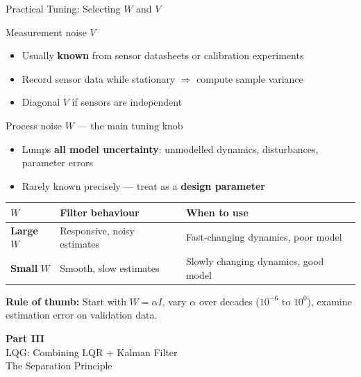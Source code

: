 \documentclass[aspectratio=169,11pt]{beamer}
\begin{document}
\begin{frame}[shrink=5]{Practical Tuning: Selecting $W$ and $V$}
\begin{block}{Measurement noise $V$}
\begin{itemize}
  \item Usually \textbf{known} from sensor datasheets or calibration experiments
  \item Record sensor data while stationary $\Rightarrow$ compute sample variance
  \item Diagonal $V$ if sensors are independent
\end{itemize}
\end{block}

\begin{block}{Process noise $W$ --- the main tuning knob}
\begin{itemize}
  \item Lumps \textbf{all model uncertainty}: unmodelled dynamics, disturbances, parameter errors
  \item Rarely known precisely --- treat as a \textbf{design parameter}
\end{itemize}
\end{block}

\begin{center}
\renewcommand{\arraystretch}{1.2}
\begin{tabular}{l l l}
\toprule
$W$ & Filter behaviour & When to use \\
\midrule
\textbf{Large} $W$ & Responsive, noisy estimates & Fast-changing dynamics, poor model \\
\textbf{Small} $W$ & Smooth, slow estimates & Slowly changing dynamics, good model \\
\bottomrule
\end{tabular}
\end{center}

\smallskip
{\small \textbf{Rule of thumb:} Start with $W = \alpha I$, vary $\alpha$ over decades ($10^{-6}$ to $10^{0}$), examine estimation error on validation data.}
\end{frame}


\begin{frame}{}
\centering
\vfill
{\Huge\bfseries Part III}\\[12pt]
{\Large LQG: Combining LQR + Kalman Filter}\\[6pt]
{\normalsize The Separation Principle}
\vfill
\end{frame}
\end{document}
